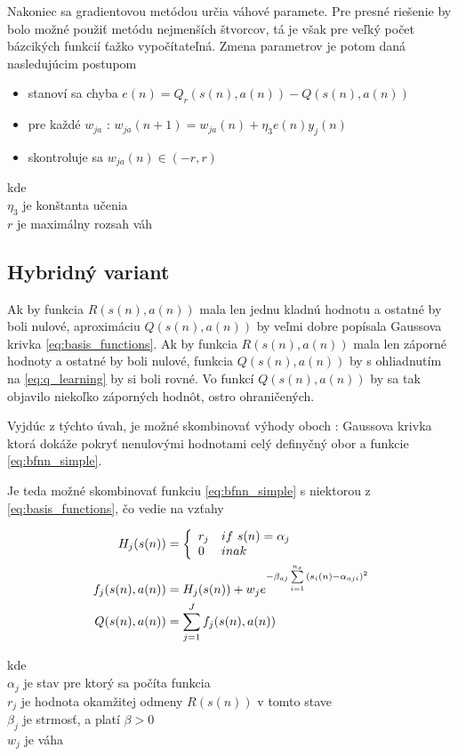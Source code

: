 Nakoniec sa gradientovou metódou určia váhové paramete. Pre presné
riešenie by bolo možné použiť metódu nejmenších štvorcov, tá je však pre veľký počet
bázcikých funkcií ťažko vypočítateľná. Zmena parametrov je potom daná nasledujúcim postupom

\begin{itemize}
\item stanoví sa chyba $e(n) = Q_r(s(n), a(n)) - Q(s(n), a(n))$
\item pre každé $w_{ja}$ : $w_{ja}(n+1)= w_{ja}(n) + \eta_3 e(n)y_j(n)$
\item skontroluje sa $w_{ja}(n) \in (-r, r)$
\end{itemize}

kde \\
$\eta_3$ je konštanta učenia \\
$r$ je maximálny rozsah váh \\

\subsection{Hybridný variant}

Ak by funkcia $R(s(n), a(n))$ mala len jednu kladnú hodnotu a ostatné by boli
nulové, aproximáciu $Q(s(n), a(n))$ by veľmi dobre popísala Gaussova krivka \ref{eq:basis_functions}.
Ak by funkcia $R(s(n), a(n))$ mala len záporné hodnoty a ostatné by boli
nulové, funkcia $Q(s(n), a(n))$ by s ohliadnutím na \ref{eq:q_learning} by
si boli rovné. Vo funkcí $Q(s(n), a(n))$ by sa tak objavilo niekoľko záporných
hodnôt, ostro ohraničených.

Vyjdúc z týchto úvah, je možné skombinovať výhody oboch : Gaussova krivka
ktorá dokáže pokryť nenulovými hodnotami celý definyčný obor a funkcie \ref{eq:bfnn_simple}.

Je teda možné skombinovať funkciu \ref{eq:bfnn_simple} s niektorou z \ref{eq:basis_functions},
čo vedie na vzťahy

\begin{align}
H_j(s(n)) &=
\left\{
	\begin{array}{ll}
		r_j  & if \ s(n) = \alpha_j \\
		0 & inak
	\end{array}
\right. \\
  f_j(\boldmath{s(n), a(n)}) &= H_j(s(n)) + w_j e^{ -\beta_{aj} \sum\limits_{i=1}^{n_s}{(s_i(n) - \alpha_{aji})^2 }} \\
  Q(s(n), a(n)) &= \sum\limits_{j=1}^{J} f_j(s(n), a(n))
\end{align}

kde \\
$\alpha_j$ je stav pre ktorý sa počíta funkcia \\
$r_j$ je hodnota okamžitej odmeny $R(s(n))$ v tomto stave \\
$\beta_j$ je strmosť, a platí $\beta > 0$ \\
$w_j$ je váha \\

